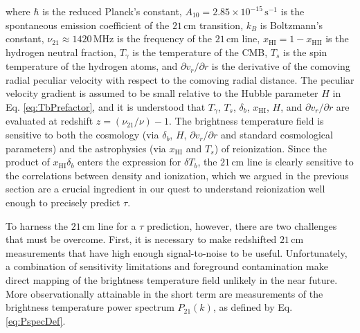 \documentclass[twocolumn,aps,prd,nofootinbib,showpacs,superscriptaddress]{revtex4-1}
\begin{document}
where $\hbar$ is the reduced Planck's constant, $A_{10}=2.85\times10^{-15}\,\textrm{s}^{-1}$ is the spontaneous emission coefficient of the $21\,\textrm{cm}$ transition, $k_B$ is Boltzmann's constant, $\nu_\textrm{21} \approx 1420\,\textrm{MHz}$ is the frequency of the $21\,\textrm{cm}$ line, $x_\textrm{HI} = 1 - x_\textrm{HII}$ is the hydrogen neutral fraction, $T_\gamma$ is the temperature of the CMB, $T_s$ is the spin temperature of the hydrogen atoms, and $\partial v_r / \partial r$ is the derivative of the comoving radial peculiar velocity with respect to the comoving radial distance. The peculiar velocity gradient is assumed to be small relative to the Hubble parameter $H$ in Eq. \eqref{eq:TbPrefactor}, and it is understood that $T_\gamma$, $T_s$, $\delta_b$, $x_\textrm{HI}$, $H$, and $\partial v_r / \partial r$ are evaluated at redshift $z = (\nu_\textrm{21} / \nu ) -1$. The brightness temperature field is sensitive to both the cosmology (via $\delta_b$, $H$, $\partial v_r / \partial r$ and standard cosmological parameters) and the astrophysics (via $x_\textrm{HI}$ and $T_s$) of reionization. Since the product of $x_\textrm{HI} \delta_b$ enters the expression for $\delta T_b$, the $21\,\textrm{cm}$ line is clearly sensitive to the correlations between density and ionization, which we argued in the previous section are a crucial ingredient in our quest to understand reionization well enough to precisely predict $\tau$.

%

To harness the $21\,\textrm{cm}$ line for a $\tau$ prediction, however, there are two challenges that must be overcome. First, it is necessary to make redshifted $21\,\textrm{cm}$ measurements that have high enough signal-to-noise to be useful. Unfortunately, a combination of sensitivity limitations and foreground contamination make direct mapping of the brightness temperature field unlikely in the near future. More observationally attainable in the short term are measurements of the brightness temperature power spectrum $P_\textrm{21} (k)$, as defined by Eq. \eqref{eq:PspecDef}.
\end{document}
